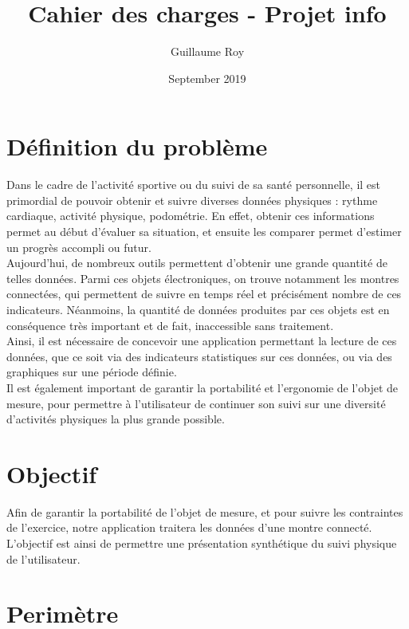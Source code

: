 \documentclass{article}
\title{Cahier des charges - Projet info}
\author{Guillaume Roy}
\date{September 2019}
\newcommand\tab[1][1cm]{\hspace*{#1}}
\begin{document}
\maketitle
\newpage

\tableofcontents
\newpage

\section{Définition du problème}

\tab Dans le cadre de l'activité sportive ou du suivi de sa santé personnelle, il est primordial de pouvoir obtenir et suivre diverses données physiques : rythme cardiaque, activité physique, podométrie. En effet, obtenir ces informations permet au début d'évaluer sa situation, et ensuite les comparer permet d'estimer un progrès accompli ou futur. \\
\tab Aujourd'hui, de nombreux outils permettent d'obtenir une grande quantité de telles données. Parmi ces objets électroniques, on trouve notamment les montres connectées, qui permettent de suivre en temps réel et précisément nombre de ces indicateurs. Néanmoins, la quantité de données produites par ces objets est en conséquence très important et de fait, inaccessible sans traitement. \\
\tab Ainsi, il est nécessaire de concevoir une application permettant la lecture de ces données, que ce soit via des indicateurs statistiques sur ces données, ou via des graphiques sur une période définie. \\
\tab Il est également important de garantir la portabilité et l'ergonomie de l'objet de mesure, pour permettre à l'utilisateur de continuer son suivi sur une diversité d'activités physiques la plus grande possible. \\

\section{Objectif}

\tab Afin de garantir la portabilité de l'objet de mesure, et pour suivre les contraintes de l'exercice, notre application traitera les données d'une montre connecté. L'objectif est ainsi de permettre une présentation synthétique du suivi physique de l'utilisateur.

\section{Perimètre}
\end{document}
